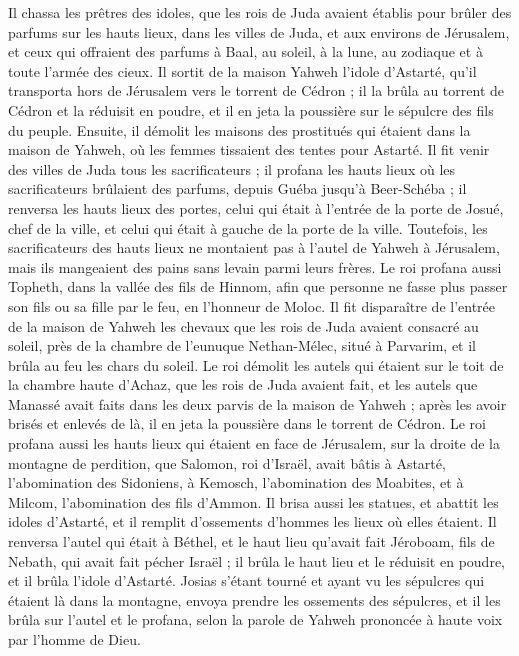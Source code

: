 \begin{multicols}{2}
Il chassa les prêtres des idoles, que les rois de Juda avaient établis pour brûler des parfums sur les hauts lieux, dans les villes de Juda, et aux environs de Jérusalem, et ceux qui offraient des parfums à Baal, au soleil, à la lune, au zodiaque et à toute l’armée des cieux.
Il sortit de la maison Yahweh l’idole d’Astarté, qu’il transporta hors de Jérusalem vers le torrent de Cédron ; il la brûla au torrent de Cédron et la réduisit en poudre, et il en jeta la poussière sur le sépulcre des fils du peuple.
Ensuite, il démolit les maisons des prostitués qui étaient dans la maison de Yahweh, où les femmes tissaient des tentes pour Astarté.
Il fit venir des villes de Juda tous les sacrificateurs ; il profana les hauts lieux où les sacrificateurs brûlaient des parfums, depuis Guéba jusqu’à Beer-Schéba ; il renversa les hauts lieux des portes, celui qui était à l’entrée de la porte de Josué, chef de la ville, et celui qui était à gauche de la porte de la ville.
Toutefois, les sacrificateurs des hauts lieux ne montaient pas à l’autel de Yahweh à Jérusalem, mais ils mangeaient des pains sans levain parmi leurs frères.
Le roi profana aussi Topheth, dans la vallée des fils de Hinnom, afin que personne ne fasse plus passer son fils ou sa fille par le feu, en l’honneur de Moloc\FTNT{}.
Il fit disparaître de l’entrée de la maison de Yahweh les chevaux que les rois de Juda avaient consacré au soleil, près de la chambre de l’eunuque Nethan-Mélec, situé à Parvarim, et il brûla au feu les chars du soleil.
Le roi démolit les autels qui étaient sur le toit de la chambre haute d’Achaz, que les rois de Juda avaient fait, et les autels que Manassé avait faits dans les deux parvis de la maison de Yahweh ; après les avoir brisés et enlevés de là, il en jeta la poussière dans le torrent de Cédron.
Le roi profana aussi les hauts lieux qui étaient en face de Jérusalem, sur la droite de la montagne de perdition, que Salomon, roi d’Israël, avait bâtis à Astarté, l’abomination des Sidoniens, à Kemosch, l’abomination des Moabites, et à Milcom, l’abomination des fils d’Ammon.
Il brisa aussi les statues, et abattit les idoles d’Astarté, et il remplit d’ossements d’hommes les lieux où elles étaient.
Il renversa l’autel qui était à Béthel, et le haut lieu qu’avait fait Jéroboam, fils de Nebath, qui avait fait pécher Israël ; il brûla le haut lieu et le réduisit en poudre, et il brûla l’idole d’Astarté.
Josias s’étant tourné et ayant vu les sépulcres qui étaient là dans la montagne, envoya prendre les ossements des sépulcres, et il les brûla sur l’autel et le profana, selon la parole de Yahweh prononcée à haute voix par l’homme de Dieu.

\end{multicols}
